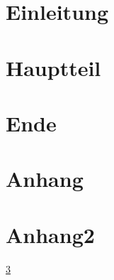 \documentclass[12pt,ngerman]{scrartcl}
\begin{document}
\tableofcontents

\section{Einleitung}\label{sec:eins}

\blindtext[5]

\section{Hauptteil}

\blindtext[5]

\section{Ende}\label{sec:eins}

\blindtext[5]

\section{Anhang}

\blindtext[5]



\section{Anhang2}

\blindtext[5]

\ref{sec:eins}
\end{document}
